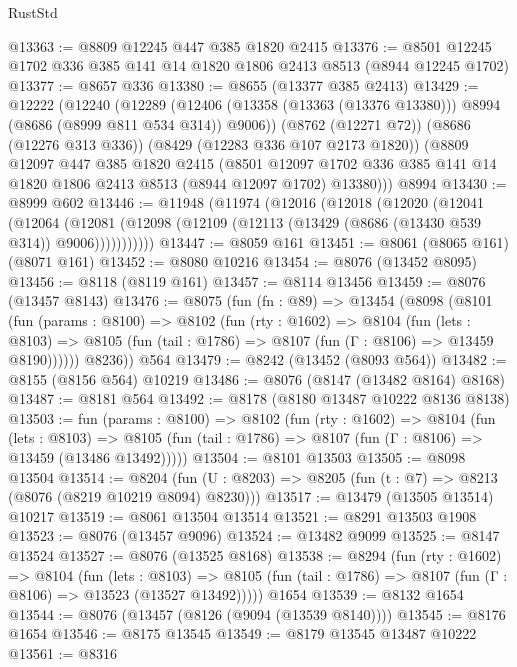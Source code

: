 \begin{lexlean}{RustStd}
\begin{coremodule}
@13363 := @8809 @12245 @447 @385 @1820 @2415
@13376 := @8501 @12245 @1702 @336 @385 @141 @14 @1820 @1806 @2413 @8513 (@8944 @12245 @1702)
@13377 := @8657 @336
@13380 := @8655 (@13377 @385 @2413)
@13429 := @12222
    (@12240
      (@12289 (@12406 (@13358 (@13363 (@13376 @13380))) @8994 (@8686 (@8999 @811 @534 @314)) @9006))
      (@8762 (@12271 @72))
      (@8686 (@12276 @313 @336))
      (@8429 (@12283 @336 @107 @2173 @1820))
      (@8809
        @12097
        @447
        @385
        @1820
        @2415
        (@8501
          @12097
          @1702
          @336
          @385
          @141
          @14
          @1820
          @1806
          @2413
          @8513
          (@8944 @12097 @1702)
          @13380)))
    @8994
@13430 := @8999 @602
@13446 := @11948
    (@11974
      (@12016
        (@12018
          (@12020
            (@12041
              (@12064
                (@12081 (@12098 (@12109 (@12113 (@13429 (@8686 (@13430 @539 @314)) @9006)))))))))))
@13447 := @8059 @161
@13451 := @8061 (@8065 @161) (@8071 @161)
@13452 := @8080 @10216
@13454 := @8076 (@13452 @8095)
@13456 := @8118 (@8119 @161)
@13457 := @8114 @13456
@13459 := @8076 (@13457 @8143)
@13476 := @8075
    (fun (fn : @89) =>
    @13454
      (@8098
        (@8101
          (fun (params : @8100) =>
          @8102
            (fun (rty : @1602) =>
            @8104
              (fun (lets : @8103) =>
              @8105 (fun (tail : @1786) => @8107 (fun (Γ : @8106) => @13459 @8190))))))
        @8236))
    @564
@13479 := @8242 (@13452 (@8093 @564))
@13482 := @8155 (@8156 @564) @10219
@13486 := @8076 (@8147 (@13482 @8164) @8168)
@13487 := @8181 @564
@13492 := @8178 (@8180 @13487 @10222 @8136 @8138)
@13503 := fun (params : @8100) =>
  @8102
    (fun (rty : @1602) =>
    @8104
      (fun (lets : @8103) =>
      @8105 (fun (tail : @1786) => @8107 (fun (Γ : @8106) => @13459 (@13486 @13492)))))
@13504 := @8101 @13503
@13505 := @8098 @13504
@13514 := @8204
    (fun (U : @8203) => @8205 (fun (t : @7) => @8213 (@8076 (@8219 @10219 @8094) @8230)))
@13517 := @13479 (@13505 @13514) @10217
@13519 := @8061 @13504 @13514
@13521 := @8291 @13503 @1908
@13523 := @8076 (@13457 @9096)
@13524 := @13482 @9099
@13525 := @8147 @13524
@13527 := @8076 (@13525 @8168)
@13538 := @8294
    (fun (rty : @1602) =>
    @8104
      (fun (lets : @8103) =>
      @8105 (fun (tail : @1786) => @8107 (fun (Γ : @8106) => @13523 (@13527 @13492)))))
    @1654
@13539 := @8132 @1654
@13544 := @8076 (@13457 (@8126 (@9094 (@13539 @8140))))
@13545 := @8176 @1654
@13546 := @8175 @13545
@13549 := @8179 @13545 @13487 @10222
@13561 := @8316

\end{coremodule}
\end{lexlean}
